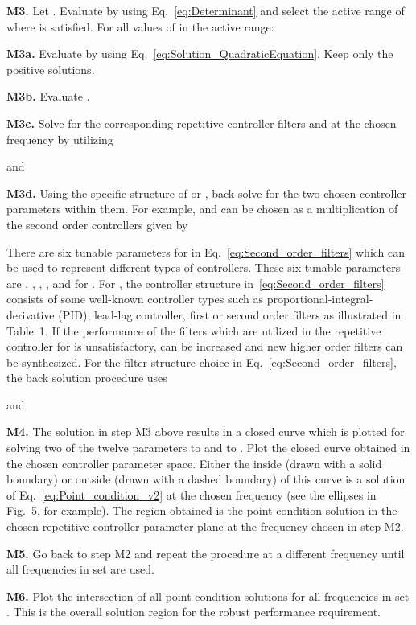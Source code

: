 \documentclass[12pt,draftcls,onecolumn]{IEEEtran}
\begin{document}
\textbf{M3.} Let . Evaluate  by using Eq.~\eqref{eq:Determinant} and select the active range of  where  is satisfied. For all values of  in the active range:

\textbf{M3a.} Evaluate  by using Eq.~\eqref{eq:Solution_QuadraticEquation}. Keep only the positive solutions.

\textbf{M3b.} Evaluate .

\textbf{M3c.} Solve for the corresponding repetitive controller filters  and  at the chosen frequency  by utilizing

and


\textbf{M3d.} Using the specific structure of  or , back solve for the two chosen controller parameters within them. For example,  and  can be chosen as a multiplication of the second order controllers given by

There are six tunable parameters for  in Eq.~\eqref{eq:Second_order_filters} which can be used to represent different types of controllers. These six tunable parameters are , , , ,  and  for . For , the controller
structure in~\eqref{eq:Second_order_filters} consists of some well-known controller types such as proportional-integral-derivative (PID), lead-lag
controller, first or second order filters as illustrated in Table~1. If the performance of the filters which are utilized in the repetitive controller for  is unsatisfactory,  can be increased and new higher order filters can be synthesized. For the filter structure choice in Eq.~\eqref{eq:Second_order_filters}, the back solution procedure uses

and



\textbf{M4.} The solution in step M3 above results in a closed curve which is plotted for solving two of the twelve parameters
 to  and  to . Plot the closed curve obtained in the chosen controller parameter space. Either
the inside (drawn with a solid boundary) or outside (drawn with a dashed boundary) of this curve is a solution of Eq.~\eqref{eq:Point_condition_v2} at the chosen frequency (see the ellipses in Fig.~5, for example). The region obtained is the point condition solution in the chosen repetitive controller parameter plane at the frequency chosen in step M2.

\textbf{M5.} Go back to step M2 and repeat the procedure at a different frequency until all frequencies in set  are used.

\textbf{M6.} Plot the intersection of all point condition solutions for all frequencies in set . This is the overall solution region for the robust performance requirement.
\end{document}
